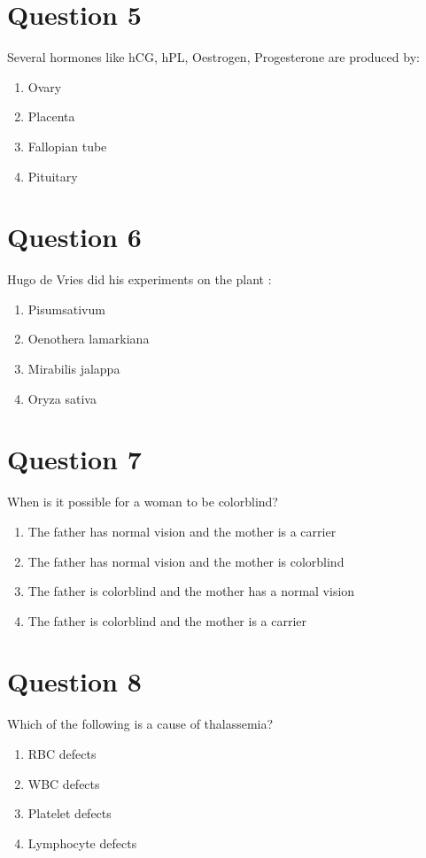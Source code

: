 \documentclass{article}
\begin{document}
\section*{Question 5}
Several hormones like hCG, hPL, Oestrogen, Progesterone are produced by:
\begin{enumerate}[label=(\alph*)]
\item Ovary
\item Placenta
\item Fallopian tube
\item Pituitary
\end{enumerate}
\newpage
\section*{Question 6}
Hugo de Vries did his experiments on the plant :
\begin{enumerate}[label=(\alph*)]
\item Pisumsativum
\item Oenothera lamarkiana
\item Mirabilis jalappa
\item Oryza sativa
\end{enumerate}
\newpage
\section*{Question 7}
When is it possible for a woman to be colorblind?
\begin{enumerate}[label=(\alph*)]
\item The father has normal vision and the mother is a carrier
\item The father has normal vision and the mother is colorblind
\item The father is colorblind and the mother has a normal vision
\item The father is colorblind and the mother is a carrier
\end{enumerate}
\newpage
\section*{Question 8}
Which of the following is a cause of thalassemia?
\begin{enumerate}[label=(\alph*)]
\item RBC defects
\item WBC defects
\item Platelet defects
\item Lymphocyte defects
\end{enumerate}
\newpage
\end{document}
